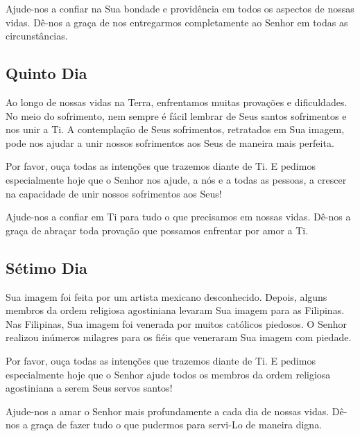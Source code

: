 \documentclass[18pt]{article}
\begin{document}
Ajude-nos a confiar na Sua bondade e providência em todos os aspectos de nossas vidas. Dê-nos a graça de nos entregarmos completamente ao Senhor em todas as circunstâncias.

\textbf{}


\subsection{Quinto Dia}
\textbf{}




Ao longo de nossas vidas na Terra, enfrentamos muitas provações e dificuldades. No meio do sofrimento, nem sempre é fácil lembrar de Seus santos sofrimentos e nos unir a Ti. A contemplação de Seus sofrimentos, retratados em Sua imagem, pode nos ajudar a unir nossos sofrimentos aos Seus de maneira mais perfeita.

Por favor, ouça todas as intenções que trazemos diante de Ti. E pedimos especialmente hoje que o Senhor nos ajude, a nós e a todas as pessoas, a crescer na capacidade de unir nossos sofrimentos aos Seus!

Ajude-nos a confiar em Ti para tudo o que precisamos em nossas vidas. Dê-nos a graça de abraçar toda provação que possamos enfrentar por amor a Ti.

\textbf{}


\subsection{Sétimo Dia}
\textbf{}




Sua imagem foi feita por um artista mexicano desconhecido. Depois, alguns membros da ordem religiosa agostiniana levaram Sua imagem para as Filipinas. Nas Filipinas, Sua imagem foi venerada por muitos católicos piedosos. O Senhor realizou inúmeros milagres para os fiéis que veneraram Sua imagem com piedade.

Por favor, ouça todas as intenções que trazemos diante de Ti. E pedimos especialmente hoje que o Senhor ajude todos os membros da ordem religiosa agostiniana a serem Seus servos santos!

Ajude-nos a amar o Senhor mais profundamente a cada dia de nossas vidas. Dê-nos a graça de fazer tudo o que pudermos para servi-Lo de maneira digna.

\textbf{}
\end{document}
